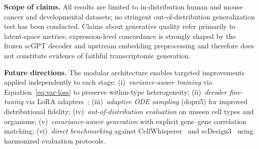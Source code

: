 \documentclass[genes,article,submit,pdftex,oneauthor]{Definitions/mdpi}
\begin{document}
\textbf{Scope of claims.} All results are limited to in-distribution human and mouse cancer and developmental datasets; no stringent out-of-distribution generalization test has been conducted. Claims about generative quality refer primarily to latent-space metrics; expression-level concordance is strongly shaped by the frozen scGPT decoder and upstream embedding preprocessing and therefore does not constitute evidence of faithful transcriptomic generation.

\textbf{Future directions.} The modular architecture enables targeted improvements applied independently to each stage: (i)~\emph{variance-aware training} via Equation~\ref{eq:var-loss} to preserve within-type heterogeneity; (ii)~\emph{decoder fine-tuning} via LoRA adapters~\cite{ref-scgpt}; (iii)~\emph{adaptive ODE sampling} (dopri5) for improved distributional fidelity; (iv)~\emph{out-of-distribution evaluation} on unseen cell types and organisms; (v)~\emph{covariance-aware generation} with explicit gene--gene correlation matching; (vi)~\emph{direct benchmarking} against CellWhisperer~\cite{ref-cellwhisperer} and scDesign3~\cite{ref-scdesign3} using harmonized evaluation protocols.





\end{document}

